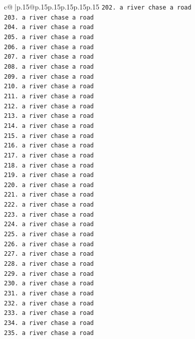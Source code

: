 \documentclass{article}
\begin{document}
{\begin{supertabular}{c@{$\;$}|p{.15\linewidth}@{}p{.15\linewidth}p{.15\linewidth}p{.15\linewidth}p{.15\linewidth}p{.15\linewidth}}
{{{\texttt{202. a river chase a road} \\
\texttt{203. a river chase a road} \\
\texttt{204. a river chase a road} \\
\texttt{205. a river chase a road} \\
\texttt{206. a river chase a road} \\
\texttt{207. a river chase a road} \\
\texttt{208. a river chase a road} \\
\texttt{209. a river chase a road} \\
\texttt{210. a river chase a road} \\
\texttt{211. a river chase a road} \\
\texttt{212. a river chase a road} \\
\texttt{213. a river chase a road} \\
\texttt{214. a river chase a road} \\
\texttt{215. a river chase a road} \\
\texttt{216. a river chase a road} \\
\texttt{217. a river chase a road} \\
\texttt{218. a river chase a road} \\
\texttt{219. a river chase a road} \\
\texttt{220. a river chase a road} \\
\texttt{221. a river chase a road} \\
\texttt{222. a river chase a road} \\
\texttt{223. a river chase a road} \\
\texttt{224. a river chase a road} \\
\texttt{225. a river chase a road} \\
\texttt{226. a river chase a road} \\
\texttt{227. a river chase a road} \\
\texttt{228. a river chase a road} \\
\texttt{229. a river chase a road} \\
\texttt{230. a river chase a road} \\
\texttt{231. a river chase a road} \\
\texttt{232. a river chase a road} \\
\texttt{233. a river chase a road} \\
\texttt{234. a river chase a road} \\
\texttt{235. a river chase a road} \\
}}}
\end{supertabular}}
\end{document}
